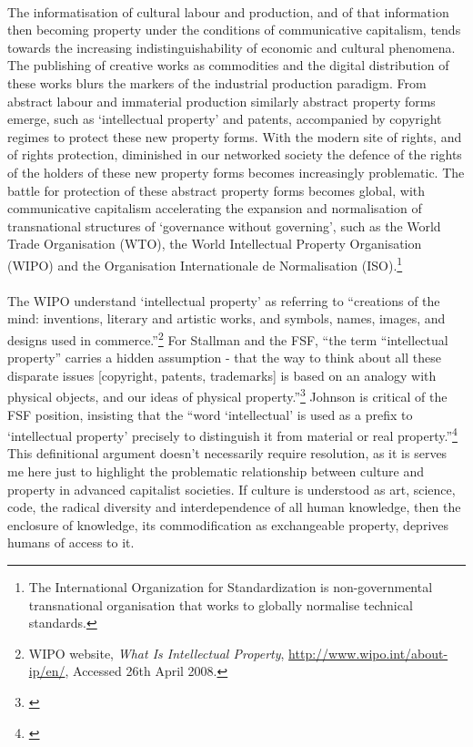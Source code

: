 \documentclass[11pt,titlepage]{book}
\begin{document}
\paragraph{}The informatisation of cultural labour and production, and of that information then becoming property under the conditions of communicative capitalism, tends towards the increasing indistinguishability of economic and cultural phenomena. The publishing of creative works as commodities and the digital distribution of these works blurs the markers of the industrial production paradigm. From abstract labour and immaterial production similarly abstract property forms emerge, such as `intellectual property' and patents, accompanied by copyright regimes to protect these new property forms. With the modern site of rights, and of rights protection, diminished in our networked society the defence of the rights of the holders of these new property forms becomes increasingly problematic. The battle for protection of these abstract property forms becomes global, with communicative capitalism accelerating the expansion and normalisation of transnational structures of `governance without governing', such as the World Trade Organisation (WTO), the World Intellectual Property Organisation (WIPO) and the Organisation Internationale de Normalisation (ISO).\footnote{The International Organization for Standardization is non-governmental transnational organisation that works to globally normalise technical standards.}

\paragraph{}The WIPO understand `intellectual property' as referring to ``creations of the mind: inventions, literary and artistic works, and symbols, names, images, and designs used in commerce.''\footnote{WIPO website, \textit{What Is Intellectual Property}, \url{http://www.wipo.int/about-ip/en/}, Accessed 26th April 2008.} For Stallman and the FSF, ``the term ``intellectual property'' carries a hidden assumption - that the way to think about all these disparate issues [copyright, patents, trademarks] is based on an analogy with physical objects, and our ideas of physical property.''\footnote{\cite{Stallman:2008wa}} Johnson is critical of the FSF position, insisting that the ``word `intellectual' is used as a prefix to `intellectual property' precisely to distinguish it from material or real property.''\footnote{\cite{Johnson:2004wa}} This definitional argument doesn't necessarily require resolution, as it is serves me here just to highlight the problematic relationship between culture and property in advanced capitalist societies. If culture is understood as art, science, code, the radical diversity and interdependence of all human knowledge, then the enclosure of knowledge, its commodification as exchangeable property, deprives humans of access to it.
\end{document}
